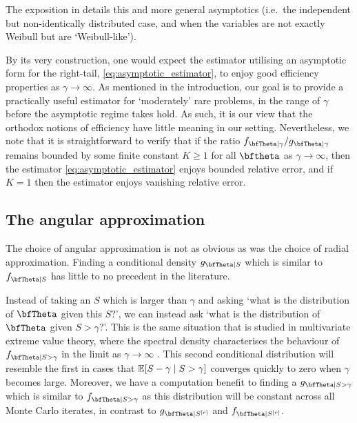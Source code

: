 The exposition in \cite{asmussen2017tail} details this and more general asymptotics (i.e.\ the independent but non-identically distributed case, and when the variables are not exactly Weibull but are `Weibull-like').

By its very construction, one would expect the estimator utilising an asymptotic form for the right-tail, \eqref{eq:asymptotic_estimator}, to
enjoy good efficiency properties as $\gamma\to\infty$.  As mentioned in the introduction, our goal is to provide a practically useful
estimator for `moderately' rare problems, in the range of $\gamma$ before the asymptotic regime takes hold.
As such, it is our view that the orthodox notions of efficiency have little meaning in our setting.
Nevertheless, we note that it is straightforward to verify that if the
ratio $f_{\bfTheta \mid \gamma}/g_{\bfTheta \mid \gamma}$ remains bounded by some finite constant $K\geq 1$ for all $\bftheta$ as $\gamma\to\infty$, then the estimator \eqref{eq:asymptotic_estimator} enjoys
bounded relative error, and if $K=1$ then the estimator enjoys vanishing relative error.

\subsection{The angular approximation}

The choice of angular approximation is not as obvious as was the choice of radial approximation.
Finding a conditional density $g_{\bfTheta \mid S}$ which is similar to $f_{\bfTheta \mid S}$ has little to no precedent in the literature.

Instead of taking an $S$ which is larger than $\gamma$ and asking `what is the distribution of $\bfTheta$ given this $S$?', we can instead ask `what is the distribution of $\bfTheta$ given $S > \gamma$?'.
This is the same situation that is studied in multivariate extreme value theory, where the spectral density characterises the behaviour of $f_{\bfTheta \mid S>\gamma}$ in
the limit as $\gamma\to\infty$ \cite{deHaanResnick1977}.
This second conditional distribution will resemble the first in cases that $\operatorname{{\mathbb E}}[ S-\gamma \mid S > \gamma]$ converges quickly to zero when $\gamma$ becomes large.
Moreover, we have a computation benefit to finding a $g_{\bfTheta \mid S > \gamma}$ which is similar to $f_{\bfTheta \mid S > \gamma}$ as this distribution will be constant across all Monte Carlo iterates, in contrast to $g_{\bfTheta \mid S^{[r]}}$ and $f_{\bfTheta \mid S^{[r]}}$.

